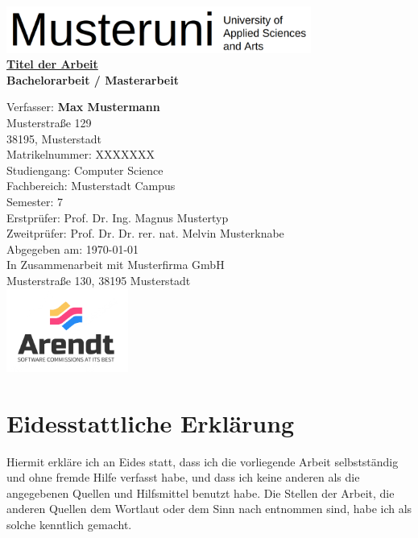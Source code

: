 \documentclass[a4paper,11pt]{report}
\begin{document}
\begin{titlepage}
    \centering
    \includegraphics[width=0.75\textwidth]{images/musteruni_logo.png}\\[1.5cm] %
    {\LARGE \textbf{\underline{Titel der Arbeit}}}\\[1cm]
    \textbf{Bachelorarbeit / Masterarbeit}\\[1cm]
    \onehalfspacing %
    \raggedright
    Verfasser:
    \tabto{5cm} \textbf{Max Mustermann}\\
    \tabto{5cm} Musterstraße 129\\
    \tabto{5cm} 38195, Musterstadt\\[0.5cm]
    Matrikelnummer: \tabto{5cm} XXXXXXX\\[0.5cm]
    Studiengang: \tabto{5cm} Computer Science\\[0.5cm]
    Fachbereich: \tabto{5cm} Musterstadt Campus\\[0.5cm]
    Semester: \tabto{5cm} 7\\[0.5cm]
    Erstprüfer: \tabto{5cm} Prof. Dr. Ing. Magnus Mustertyp\\[0.5cm]
    Zweitprüfer: \tabto{5cm} Prof. Dr. Dr. rer. nat. Melvin Musterknabe\\[0.5cm]
    Abgegeben am: \tabto{5cm} \today \\[1cm]
    In Zusammenarbeit mit Musterfirma GmbH\\
    Musterstraße 130, 38195 Musterstadt\\[1cm]
    \hfill \includegraphics[width=0.3\textwidth]{images/arendt_company.png} %
    \singlespacing %
\end{titlepage}

\newpage



\chapter*{Eidesstattliche Erklärung}
Hiermit erkläre ich an Eides statt, dass ich die vorliegende Arbeit selbstständig und ohne fremde Hilfe verfasst habe, und dass ich keine anderen als die angegebenen Quellen und Hilfsmittel benutzt habe. Die Stellen der Arbeit, die anderen Quellen dem Wortlaut oder dem Sinn nach entnommen sind, habe ich als solche kenntlich gemacht.
\end{document}

